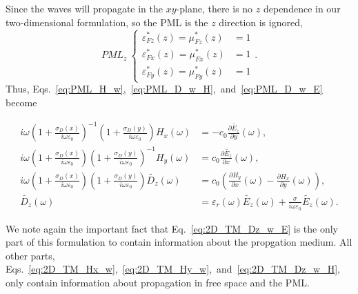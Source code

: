\documentclass[12pt,twocolumn]{article}
\begin{document}
Since the waves will propagate in the $xy$-plane, there is no $z$ dependence in our two-dimensional formulation, so the PML is the $z$ direction is ignored,
\begin{subequations}
\begin{equation}
\textit{PML}_z~\left\{\begin{split}
\varepsilon_{Fz}^*(z)=\mu_{Fz}^*(z)&=1\\
\varepsilon_{Fx}^*(z)=\mu_{Fx}^*(z)&=1\\
\varepsilon_{Fy}^*(z)=\mu_{Fy}^*(z)&=1
\end{split}\right..
\end{equation}
\end{subequations}
 Thus, Eqs.~\ref{eq:PML_H_w},~\ref{eq:PML_D_w_H},~and~\ref{eq:PML_D_w_E} become
\begin{strip}
\begin{subequations}
\begin{align}
\label{eq:2D_TM_Hx_w}i\omega\left(1+\frac{\sigma_D(x)}{i\omega\varepsilon_0}\right)^{-1}\left(1+\frac{\sigma_D(y)}{i\omega\varepsilon_0}\right)H_x(\omega) &= -c_0\frac{\partial \tilde{E_z}}{\partial y}(\omega),\\
\label{eq:2D_TM_Hy_w}i\omega\left(1+\frac{\sigma_D(x)}{i\omega\varepsilon_0}\right)\left(1+\frac{\sigma_D(y)}{i\omega\varepsilon_0}\right)^{-1}H_y(\omega) &= c_0\frac{\partial \tilde{E_z}}{\partial x}(\omega),\\
\label{eq:2D_TM_Dz_w_H}i\omega\left(1+\frac{\sigma_D(x)}{i\omega\varepsilon_0}\right)\left(1+\frac{\sigma_D(y)}{i\omega\varepsilon_0}\right)\tilde{D_z}(\omega) &= c_0\left(\frac{\partial H_y}{\partial x}(\omega)-\frac{\partial H_x}{\partial y}(\omega)\right),\\
\label{eq:2D_TM_Dz_w_E}\tilde{D_z}(\omega)&=\varepsilon_r(\omega)\tilde{E_z}(\omega)+\frac{\sigma}{i\omega\varepsilon_0}\tilde{E_z}(\omega).
\end{align}
\end{subequations}
\end{strip}

\noindent We note again the important fact that Eq.~\ref{eq:2D_TM_Dz_w_E} is the only part of this formulation to contain information about the propgation medium. All other parts, Eqs.~\ref{eq:2D_TM_Hx_w},~\ref{eq:2D_TM_Hy_w},~and~\ref{eq:2D_TM_Dz_w_H}, only contain information about propagation in free space and the PML.
\end{document}
